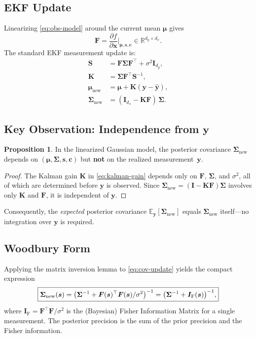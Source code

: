 \documentclass[11pt]{article}
\newcommand{\R}{\mathbb{R}}
\newcommand{\bx}{\bm{x}}
\newcommand{\by}{\bm{y}}
\newcommand{\bs}{\bm{s}}
\newcommand{\bc}{\bm{c}}
\newcommand{\bmu}{\bm{\mu}}
\newcommand{\Snew}{\bm{\Sigma}_{\mathrm{new}}}
\newcommand{\FIM}{\bm{I}_{\mathrm{F}}}
\theoremstyle{definition}
\newtheorem{proposition}{Proposition}
\begin{document}
\subsection{EKF Update}

Linearizing \eqref{eq:obs-model} around the current mean $\bmu$ gives
\begin{equation}
  \bm{F} = \frac{\partial f}{\partial \bx}\bigg|_{\bmu, \bs, \bc}
  \in \R^{d_y \times d_x}.
\end{equation}
The standard EKF measurement update is:
\begin{align}
  \bm{S}     &= \bm{F}\bm{\Sigma}\bm{F}^\top + \sigma^2 \bm{I}_{d_y},
  \label{eq:innov-cov} \\
  \bm{K}     &= \bm{\Sigma}\bm{F}^\top \bm{S}^{-1},
  \label{eq:kalman-gain} \\
  \bmu_{\mathrm{new}} &= \bmu + \bm{K}(\by - \hat{\by}),
  \label{eq:mean-update} \\
  \Snew      &= (\bm{I}_{d_x} - \bm{K}\bm{F})\,\bm{\Sigma}.
  \label{eq:cov-update}
\end{align}

\subsection{Key Observation: Independence from $\by$}

\begin{proposition}
\label{prop:y-indep}
In the linearized Gaussian model, the posterior covariance $\Snew$ depends
on $(\bmu, \bm{\Sigma}, \bs, \bc)$ but \textbf{not} on the realized
measurement~$\by$.
\end{proposition}

\begin{proof}
The Kalman gain $\bm{K}$ in \eqref{eq:kalman-gain} depends only on
$\bm{F}$, $\bm{\Sigma}$, and $\sigma^2$, all of which are determined
before $\by$ is observed.  Since $\Snew = (\bm{I} - \bm{K}\bm{F})\bm{\Sigma}$
involves only $\bm{K}$ and $\bm{F}$, it is independent of $\by$.
\end{proof}

Consequently, the \emph{expected} posterior covariance $\mathbb{E}_{\by}[\Snew]$
equals $\Snew$ itself---no integration over $\by$ is required.

\subsection{Woodbury Form}

Applying the matrix inversion lemma to \eqref{eq:cov-update} yields the
compact expression
\begin{equation}
  \boxed{%
    \Snew(\bs) = \bigl(\bm{\Sigma}^{-1}
      + \bm{F}(\bs)^\top \bm{F}(\bs) / \sigma^2\bigr)^{-1}
    = \bigl(\bm{\Sigma}^{-1} + \FIM(\bs)\bigr)^{-1},
  }
  \label{eq:woodbury}
\end{equation}
where $\FIM = \bm{F}^\top\bm{F}/\sigma^2$ is the (Bayesian) Fisher
Information Matrix for a single measurement.  The posterior precision is
the sum of the prior precision and the Fisher information.
\end{document}
